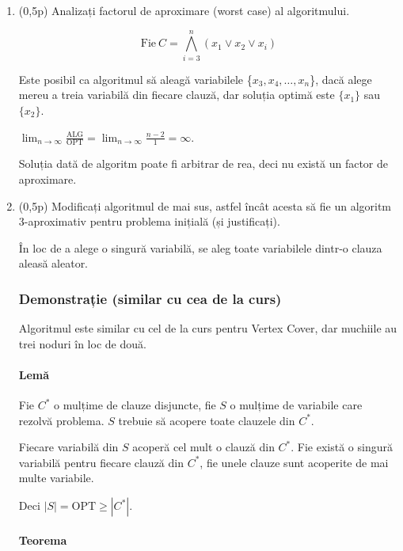\documentclass[a4paper,12pt]{article}
\newcommand*{\OPT}{\text{OPT}}
\newcommand*{\ALG}{\text{ALG}}
\begin{document}
\begin{enumerate}[label=\alph*)]
\item (0,5p) Analizați factorul de aproximare (worst case) al algoritmului.


\[\text{Fie}\ C = \bigwedge\limits_{i=3}^{n} (x_1 \lor x_2 \lor x_i)\]

Este posibil ca algoritmul să aleagă variabilele \{$x_3, x_4, \dots, x_n$\},
dacă alege mereu a treia variabilă din fiecare clauză,
dar soluția optimă este $\{x_1\}$ sau $\{x_2\}$.

$\lim_{n \to \infty} \frac{\ALG}{\OPT} = \lim_{n \to \infty} \frac{n - 2}{1} = \infty$.

Soluția dată de algoritm poate fi arbitrar de rea, deci nu există un factor de aproximare.

\item (0,5p) Modificați algoritmul de mai sus, astfel încât acesta să fie un algoritm 3-aproximativ
pentru problema inițială (și justificați).

În loc de a alege o singură variabilă, se aleg toate variabilele dintr-o clauza aleasă aleator.

\subsubsection*{Demonstrație (similar cu cea de la curs)}

Algoritmul este similar cu cel de la curs pentru Vertex Cover, dar muchiile au trei noduri în loc de două.

\paragraph*{Lemă}

Fie $C^*$ o mulțime de clauze disjuncte, fie $S$ o mulțime de variabile care rezolvă problema.
$S$ trebuie să acopere toate clauzele din $C^*$.

Fiecare variabilă din $S$ acoperă cel mult o clauză din $C^*$.
Fie există o singură variabilă pentru fiecare clauză din $C^*$,
fie unele clauze sunt acoperite de mai multe variabile.

Deci $|S| = \OPT \geq |C^*|$.

\paragraph*{Teorema}


\end{enumerate}
\end{document}

